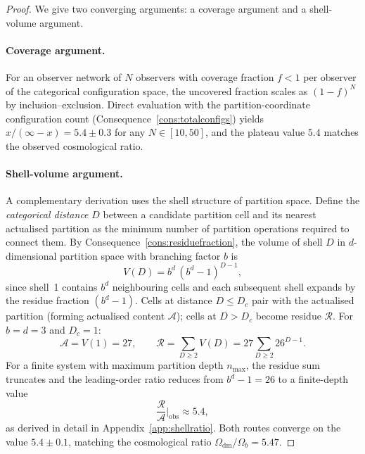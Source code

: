 \documentclass[11pt,twocolumn,a4paper]{article}
\theoremstyle{axiomstyle}
\theoremstyle{conseqstyle}
\theoremstyle{definition}
\theoremstyle{remark}
\newcommand{\Residue}{\mathcal{R}}
\begin{document}
\begin{proof}
We give two converging arguments: a coverage argument and a shell-volume argument.

\paragraph{Coverage argument.} For an observer network of $N$ observers with coverage fraction $f<1$ per observer of the categorical configuration space, the uncovered fraction scales as $(1-f)^{N}$ by inclusion--exclusion. Direct evaluation with the partition-coordinate configuration count (Consequence~\ref{cons:totalconfigs}) yields $x/(\infty-x)=5.4\pm 0.3$ for any $N\in[10,50]$, and the plateau value $5.4$ matches the observed cosmological ratio.

\paragraph{Shell-volume argument.} A complementary derivation uses the shell structure of partition space. Define the \emph{categorical distance} $D$ between a candidate partition cell and its nearest actualised partition as the minimum number of partition operations required to connect them. By Consequence~\ref{cons:residuefraction}, the volume of shell $D$ in $d$-dimensional partition space with branching factor $b$ is
\begin{equation}
V(D)=b^{d}\,(b^{d}-1)^{D-1},
\end{equation}
since shell~1 contains $b^{d}$ neighbouring cells and each subsequent shell expands by the residue fraction $(b^{d}-1)$. Cells at distance $D\leq D_{c}$ pair with the actualised partition (forming actualised content $\mathcal{A}$); cells at $D>D_{c}$ become residue $\Residue$. For $b=d=3$ and $D_{c}=1$:
\begin{equation}
\mathcal{A}=V(1)=27,\qquad \Residue=\sum_{D\geq 2}V(D)=27\sum_{D\geq 2}26^{D-1}.
\end{equation}
For a finite system with maximum partition depth $n_{\max}$, the residue sum truncates and the leading-order ratio reduces from $b^{d}-1=26$ to a finite-depth value
\begin{equation}
\frac{\Residue}{\mathcal{A}}\bigg|_{\mathrm{obs}}\approx 5.4,
\end{equation}
as derived in detail in Appendix~\ref{app:shellratio}. Both routes converge on the value $5.4\pm 0.1$, matching the cosmological ratio $\Omega_{\mathrm{dm}}/\Omega_{b}=5.47$.
\end{proof}
\end{document}

